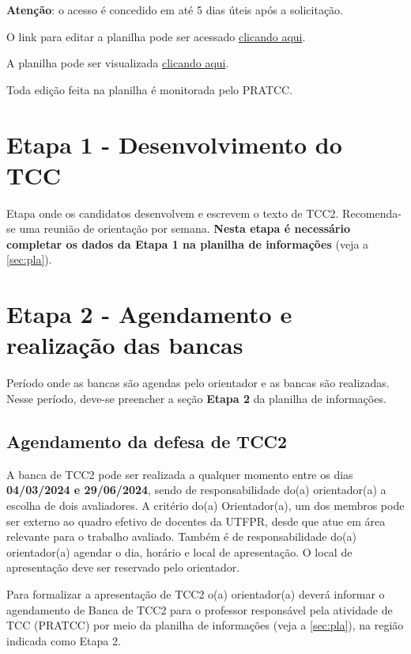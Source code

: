 \documentclass[a4paper, 12pt]{article}
\newcommand{\startdate}{04/03/2024}		%
\newcommand{\bancadate}{29/06/2024}		%
\begin{document}
	\textbf{Atenção}: o acesso é concedido em até 5 dias úteis após a solicitação.
	
	O link para editar a planilha pode ser acessado \href{https://docs.google.com/spreadsheets/d/1kvA48JsgkLEdtAHvRgQ_IDVJ_20ch6-fIN_75WXXCfA/edit?usp=sharing}{clicando aqui}.
	
	A planilha pode ser visualizada \href{https://docs.google.com/spreadsheets/d/e/2PACX-1vRBVzCBFvFwd0x0fgkgbf2qIa7ubVvVlpGffdX8YjB73VHXoW492Vf9BC0-FdDoz8Xm2ngQCqe_pHM-/pubhtml}{clicando aqui}.

	Toda edição feita na planilha é monitorada pelo PRATCC.

	\section{Etapa 1 - Desenvolvimento do TCC}
	\label{sec:et1}
	Etapa onde os candidatos desenvolvem e escrevem o texto de TCC2. Recomenda-se uma reunião de orientação por semana. \textbf{Nesta etapa é necessário completar os dados da Etapa 1 na planilha de informações} (veja a \autoref{sec:pla}).

    \section{Etapa 2 - Agendamento e realização das bancas}
	\label{sec:et2}

	Período onde as bancas são agendas pelo orientador e as bancas são realizadas. Nesse período, deve-se preencher a seção \textbf{Etapa 2} da planilha de informações.
   	
	\subsection{Agendamento da defesa de TCC2}

    A banca de TCC2 pode ser realizada a qualquer momento entre os dias \textbf{\startdate{} e \bancadate{}}, sendo de responsabilidade do(a) orientador(a) a escolha de dois avaliadores. A critério do(a) Orientador(a), um dos membros pode ser externo ao quadro efetivo de docentes da UTFPR, desde que atue em área relevante para o trabalho avaliado. Também é de responsabilidade do(a) orientador(a) agendar o dia, horário e local de apresentação. O local de apresentação deve ser reservado pelo orientador.
    
    Para formalizar a apresentação de TCC2 o(a) orientador(a) deverá informar o agendamento de Banca de TCC2 para o professor responsável pela atividade de TCC (PRATCC) por meio da planilha de informações (veja a \autoref{sec:pla}), na região indicada como Etapa 2.
    
\end{document}
